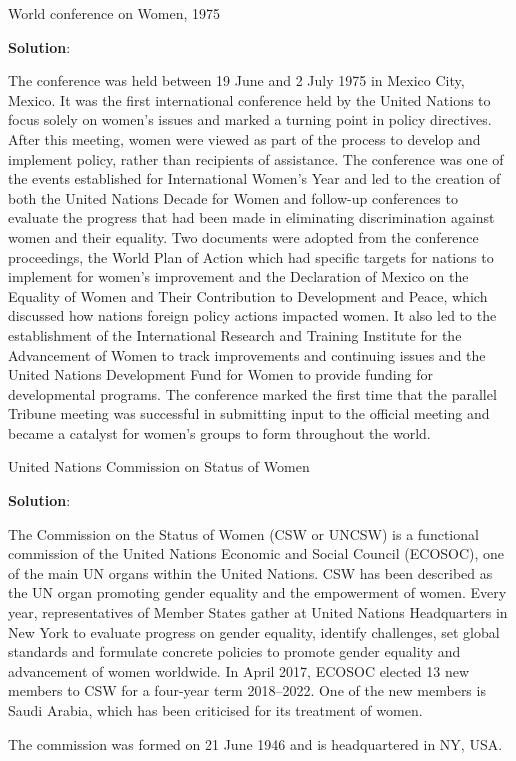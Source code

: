 \documentclass[
  openany]{book}
\newcommand{\question}{\item}
\newenvironment{solution}{ {\bfseries Solution}:}{}
\begin{document}
\begin{questions}

\question World conference on Women, 1975

\begin{solution}

The conference was held between 19 June and 2 July 1975 in Mexico City, Mexico. It was the first international conference held by the United Nations to focus solely on women's issues and marked a turning point in policy directives. After this meeting, women were viewed as part of the process to develop and implement policy, rather than recipients of assistance. The conference was one of the events established for International Women's Year and led to the creation of both the United Nations Decade for Women and follow-up conferences to evaluate the progress that had been made in eliminating discrimination against women and their equality. Two documents were adopted from the conference proceedings, the World Plan of Action which had specific targets for nations to implement for women's improvement and the Declaration of Mexico on the Equality of Women and Their Contribution to Development and Peace, which discussed how nations foreign policy actions impacted women. It also led to the establishment of the International Research and Training Institute for the Advancement of Women to track improvements and continuing issues and the United Nations Development Fund for Women to provide funding for developmental programs. The conference marked the first time that the parallel Tribune meeting was successful in submitting input to the official meeting and became a catalyst for women's groups to form throughout the world.

\end{solution}

\question United Nations Commission on Status of Women

\begin{solution}

The Commission on the Status of Women (CSW or UNCSW) is a functional commission of the United Nations Economic and Social Council (ECOSOC), one of the main UN organs within the United Nations. CSW has been described as the UN organ promoting gender equality and the empowerment of women. Every year, representatives of Member States gather at United Nations Headquarters in New York to evaluate progress on gender equality, identify challenges, set global standards and formulate concrete policies to promote gender equality and advancement of women worldwide. In April 2017, ECOSOC elected 13 new members to CSW for a four-year term 2018–2022. One of the new members is Saudi Arabia, which has been criticised for its treatment of women.

The commission was formed on 21 June 1946 and is headquartered in NY, USA.

\end{solution}

\end{questions}
\end{document}

